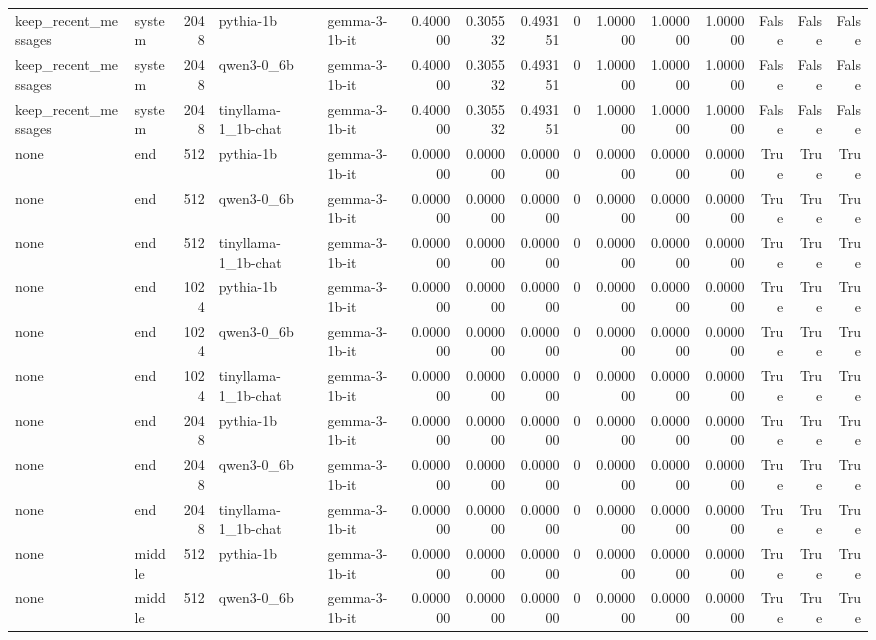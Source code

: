 \begin{tabular}{llrllrrrrrrrrrr}
keep_recent_messages & system & 2048 & pythia-1b & gemma-3-1b-it & 0.400000 & 0.305532 & 0.493151 & 0 & 1.000000 & 1.000000 & 1.000000 & False & False & False \\
keep_recent_messages & system & 2048 & qwen3-0_6b & gemma-3-1b-it & 0.400000 & 0.305532 & 0.493151 & 0 & 1.000000 & 1.000000 & 1.000000 & False & False & False \\
keep_recent_messages & system & 2048 & tinyllama-1_1b-chat & gemma-3-1b-it & 0.400000 & 0.305532 & 0.493151 & 0 & 1.000000 & 1.000000 & 1.000000 & False & False & False \\
none & end & 512 & pythia-1b & gemma-3-1b-it & 0.000000 & 0.000000 & 0.000000 & 0 & 0.000000 & 0.000000 & 0.000000 & True & True & True \\
none & end & 512 & qwen3-0_6b & gemma-3-1b-it & 0.000000 & 0.000000 & 0.000000 & 0 & 0.000000 & 0.000000 & 0.000000 & True & True & True \\
none & end & 512 & tinyllama-1_1b-chat & gemma-3-1b-it & 0.000000 & 0.000000 & 0.000000 & 0 & 0.000000 & 0.000000 & 0.000000 & True & True & True \\
none & end & 1024 & pythia-1b & gemma-3-1b-it & 0.000000 & 0.000000 & 0.000000 & 0 & 0.000000 & 0.000000 & 0.000000 & True & True & True \\
none & end & 1024 & qwen3-0_6b & gemma-3-1b-it & 0.000000 & 0.000000 & 0.000000 & 0 & 0.000000 & 0.000000 & 0.000000 & True & True & True \\
none & end & 1024 & tinyllama-1_1b-chat & gemma-3-1b-it & 0.000000 & 0.000000 & 0.000000 & 0 & 0.000000 & 0.000000 & 0.000000 & True & True & True \\
none & end & 2048 & pythia-1b & gemma-3-1b-it & 0.000000 & 0.000000 & 0.000000 & 0 & 0.000000 & 0.000000 & 0.000000 & True & True & True \\
none & end & 2048 & qwen3-0_6b & gemma-3-1b-it & 0.000000 & 0.000000 & 0.000000 & 0 & 0.000000 & 0.000000 & 0.000000 & True & True & True \\
none & end & 2048 & tinyllama-1_1b-chat & gemma-3-1b-it & 0.000000 & 0.000000 & 0.000000 & 0 & 0.000000 & 0.000000 & 0.000000 & True & True & True \\
none & middle & 512 & pythia-1b & gemma-3-1b-it & 0.000000 & 0.000000 & 0.000000 & 0 & 0.000000 & 0.000000 & 0.000000 & True & True & True \\
none & middle & 512 & qwen3-0_6b & gemma-3-1b-it & 0.000000 & 0.000000 & 0.000000 & 0 & 0.000000 & 0.000000 & 0.000000 & True & True & True \\

\end{tabular}
